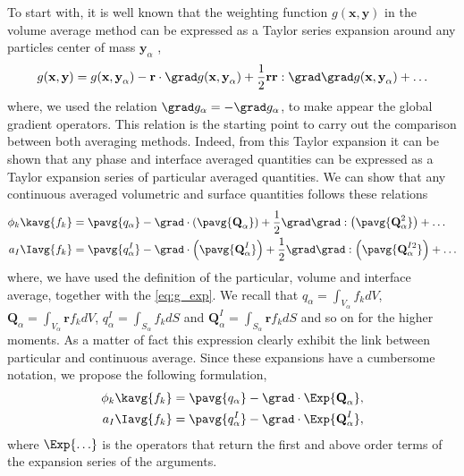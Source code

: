 To start with, it is well known that the weighting function $g(\textbf{x},\textbf{y})$ in the volume average method can be expressed as a Taylor series expansion around any particles center of mass $\textbf{y}_\alpha$ \citep{jackson1997locally},
\begin{equation}
    g(\textbf{x},\textbf{y})
    = g(\textbf{x},\textbf{y}_\alpha)
    - \textbf{r} \cdot \grad g(\textbf{x},\textbf{y}_\alpha)
    + \frac{1}{2} \textbf{r}\textbf{r} : \grad\grad g(\textbf{x},\textbf{y}_\alpha)
    + \ldots
    \label{eq:g_exp}
\end{equation} 
where, we used the relation $\grad g_\alpha = - \grad g_\alpha$, to make appear the global gradient operators. 
This relation is the starting point to carry out the comparison between both averaging methods. 
Indeed, from this Taylor expansion it can be shown that any phase and interface averaged quantities can be expressed as a Taylor expansion series of particular averaged quantities. 
We can show that any continuous averaged volumetric and surface quantities follows these relations
\begin{align*}
    \phi_k \kavg{f_k} 
    &=  \pavg{q_\alpha}
        - \grad \cdot  
        \left(\pavg{\textbf{Q}_\alpha}\right)        
        + \frac{1}{2} \grad\grad : \left(\pavg{\textbf{Q}_\alpha^2}\right)
        + \ldots  \\
    a_I \Iavg{f_k} 
    &=  \pavg{q_\alpha^I}        
        - \grad \cdot  \left(\pavg{\textbf{Q}_\alpha^I}\right)        
        + \frac{1}{2} \grad\grad : \left(\pavg{\textbf{Q}_\alpha^{I2}}\right)
        + \ldots  
\end{align*}      
where, we have used the definition of the particular, volume and interface average, together with the \ref{eq:g_exp}. 
We recall that $q_\alpha = \int_{V_\alpha} f_k dV$, $\textbf{Q}_\alpha = \int_{V_\alpha} \textbf{r} f_k dV$, $q_\alpha^I = \int_{S_\alpha} f_k dS$  and $\textbf{Q}_\alpha^I = \int_{S_\alpha} \textbf{r} f_k dS$ and so on for the higher moments. 
As a matter of fact this expression clearly exhibit the link between particular and continuous average.
Since these expansions have a cumbersome notation, we propose the following formulation, 
\begin{align}
    \phi_k \kavg{f_k} 
    &= \pavg{q_\alpha} - \grad \cdot \Exp{\textbf{Q}_\alpha},\\
    a_I \Iavg{f_k} 
    &= \pavg{q_\alpha^I} - \grad \cdot \Exp{\textbf{Q}^I_\alpha}, 
    \label{eq:q_alpha_exp}
\end{align}   
where $\Exp{\ldots}$ is the operators that return the first and above order terms of the expansion series of the arguments.

